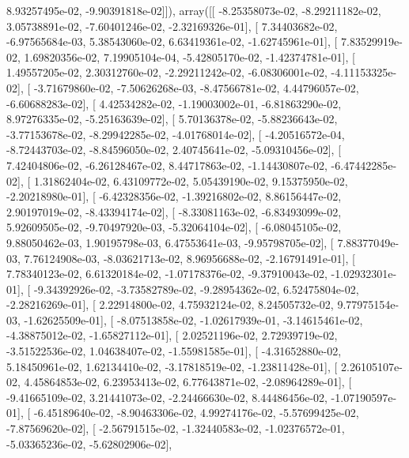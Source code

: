 \documentclass{article}
\begin{document}
          8.93257495e-02,  -9.90391818e-02]]), array([[ -8.25358073e-02,  -8.29211182e-02,   3.05738891e-02,
         -7.60401246e-02,  -2.32169326e-01],
       [  7.34403682e-02,  -6.97565684e-03,   5.38543060e-02,
          6.63419361e-02,  -1.62745961e-01],
       [  7.83529919e-02,   1.69820356e-02,   7.19905104e-04,
         -5.42805170e-02,  -1.42374781e-01],
       [  1.49557205e-02,   2.30312760e-02,  -2.29211242e-02,
         -6.08306001e-02,  -4.11153325e-02],
       [ -3.71679860e-02,  -7.50626268e-03,  -8.47566781e-02,
          4.44796057e-02,  -6.60688283e-02],
       [  4.42534282e-02,  -1.19003002e-01,  -6.81863290e-02,
          8.97276335e-02,  -5.25163639e-02],
       [  5.70136378e-02,  -5.88236643e-02,  -3.77153678e-02,
         -8.29942285e-02,  -4.01768014e-02],
       [ -4.20516572e-04,  -8.72443703e-02,  -8.84596050e-02,
          2.40745641e-02,  -5.09310456e-02],
       [  7.42404806e-02,  -6.26128467e-02,   8.44717863e-02,
         -1.14430807e-02,  -6.47442285e-02],
       [  1.31862404e-02,   6.43109772e-02,   5.05439190e-02,
          9.15375950e-02,  -2.20218980e-01],
       [ -6.42328356e-02,  -1.39216802e-02,   8.86156447e-02,
          2.90197019e-02,  -8.43394174e-02],
       [ -8.33081163e-02,  -6.83493099e-02,   5.92609505e-02,
         -9.70497920e-03,  -5.32064104e-02],
       [ -6.08045105e-02,   9.88050462e-03,   1.90195798e-03,
          6.47553641e-03,  -9.95798705e-02],
       [  7.88377049e-03,   7.76124908e-03,  -8.03621713e-02,
          8.96956688e-02,  -2.16791491e-01],
       [  7.78340123e-02,   6.61320184e-02,  -1.07178376e-02,
         -9.37910043e-02,  -1.02932301e-01],
       [ -9.34392926e-02,  -3.73582789e-02,  -9.28954362e-02,
          6.52475804e-02,  -2.28216269e-01],
       [  2.22914800e-02,   4.75932124e-02,   8.24505732e-02,
          9.77975154e-03,  -1.62625509e-01],
       [ -8.07513858e-02,  -1.02617939e-01,  -3.14615461e-02,
         -4.38875012e-02,  -1.65827112e-01],
       [  2.02521196e-02,   2.72939719e-02,  -3.51522536e-02,
          1.04638407e-02,  -1.55981585e-01],
       [ -4.31652880e-02,   5.18450961e-02,   1.62134410e-02,
         -3.17818519e-02,  -1.23811428e-01],
       [  2.26105107e-02,   4.45864853e-02,   6.23953413e-02,
          6.77643871e-02,  -2.08964289e-01],
       [ -9.41665109e-02,   3.21441073e-02,  -2.24466630e-02,
          8.44486456e-02,  -1.07190597e-01],
       [ -6.45189640e-02,  -8.90463306e-02,   4.99274176e-02,
         -5.57699425e-02,  -7.87569620e-02],
       [ -2.56791515e-02,  -1.32440583e-02,  -1.02376572e-01,
         -5.03365236e-02,  -5.62802906e-02],
\end{document}
